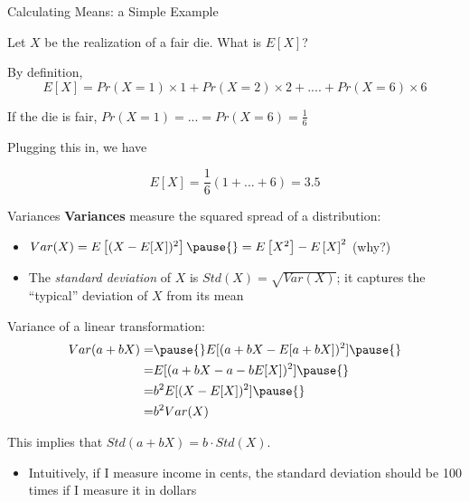 \documentclass[11pt,english,handout]{beamer}
\newenvironment{wideitemize}{\itemize\addtolength{\itemsep}{10pt}}{\enditemize}
\begin{document}
\begin{frame}{Calculating Means: a Simple Example}
	\begin{wideitemize}
		
		\item
		Let $X$ be the realization of a fair die. What is $E[X]$? 
		
		\smallskip
		\pause
		\item
		By definition,
		$$E[X] = Pr(X=1) \times 1 + Pr(X=2) \times 2 + .... + Pr(X=6) \times 6$$
		
		\pause
		\item
\smallskip
		If the die is fair, $Pr(X=1) =...=Pr(X=6) = \frac{1}{6}$
		
		\pause 
		\item 
		Plugging this in, we have
		
		$$E[X] = \frac{1}{6} (1+...+6) = 3.5$$
		
	\end{wideitemize}	
\end{frame}



\begin{frame}{Variances}
\vspace{0.2cm}
\textbf{Variances} measure the squared spread of a distribution: 

\begin{itemize}
\item $Var(X)=E\left[(X-E[X])^2\right]\pause{}=E\left[X^2\right]-E\left[X\right]^2$ (why?)
\vspace{0.1cm}\pause{}
\item The \emph{standard deviation} of $X$ is $Std(X)=\sqrt{Var(X)}$; it captures the ``typical'' deviation of $X$ from its mean
\end{itemize}
\vspace{0.2cm}
\pause{}

Variance of a linear transformation: 
\begin{align*}
Var(a+bX)=&\pause{}E[(a+bX-E[a+bX])^2]\pause{} \\
 = &E[(a+bX-a-bE[X])^2]\pause{} \\
= & b^2 E[(X-E[X])^2]\pause{} \\
 =& b^2Var(X)
\end{align*}

\pause{}
This implies that $Std(a + bX) = b \cdot Std(X)$.
	\begin{itemize}
		\item 
		Intuitively, if I measure income in cents, the standard deviation should be 100 times if I measure it in dollars
	\end{itemize}

\end{frame}
\end{document}
